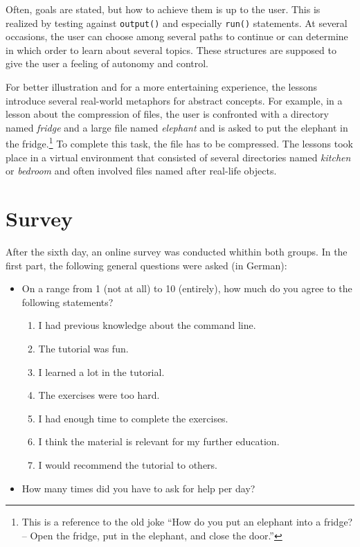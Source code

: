 \documentclass[paper=a4,twoside,abstract=on,cleardoublepage=empty,numbers=noenddot,toc=bib,12pt,appendixprefix=true]{scrreprt}
\begin{document}
Often, goals are stated, but how to achieve them is up to the user. This is realized by testing against \texttt{output()} and especially \texttt{run()} statements. At several occasions, the user can choose among several paths to continue or can determine in which order to learn about several topics. These structures are supposed to give the user a feeling of autonomy and control.

For better illustration and for a more entertaining experience, the lessons introduce several real-world metaphors for abstract concepts. For example, in a lesson about the compression of files, the user is confronted with a directory named \textit{fridge} and a large file named \textit{elephant} and is asked to put the elephant in the fridge.\footnote{This is a reference to the old joke “How do you put an elephant into a fridge? -- Open the fridge, put in the elephant, and close the door.”} To complete this task, the file has to be compressed. The lessons took place in a virtual environment that consisted of several directories named \emph{kitchen} or \emph{bedroom} and often involved files named after real-life objects.

\section{Survey}

After the sixth day, an online survey was conducted whithin both groups. In the first part, the following general questions were asked (in German):

\begin{itemize}
    \item On a range from 1 (not at all) to 10 (entirely), how much do you agree to the following statements?
        \begin{enumerate}
            \item I had previous knowledge about the command line.
            \item The tutorial was fun.
            \item I learned a lot in the tutorial.
            \item The exercises were too hard.
            \item I had enough time to complete the exercises.
            \item I think the material is relevant for my further education.
            \item I would recommend the tutorial to others.
        \end{enumerate}
    \item How many times did you have to ask for help per day?
\end{itemize}
\end{document}
